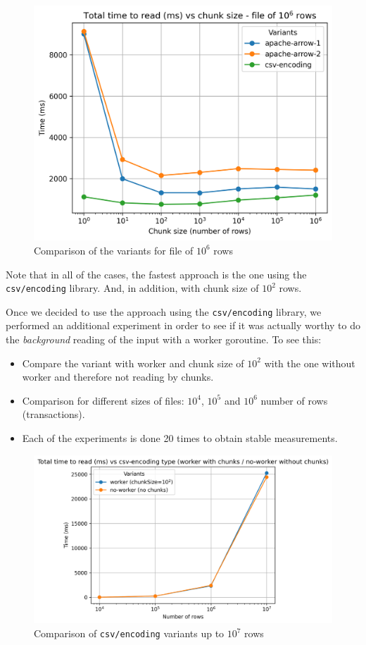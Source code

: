 \documentclass{article}
\begin{document}
\begin{figure}[H]
  \centering
  \includegraphics[scale = 0.7]{images/read-input-10-6.png}
  \caption{Comparison of the variants for file of $10^6$ rows}
\end{figure}

Note that in all of the cases, the fastest approach is the one using the \texttt{csv/encoding} library. And, in addition, with chunk size of $10^2$ rows.

Once we decided to use the approach using the \texttt{csv/encoding} library, we performed an additional experiment in order to see if it was actually worthy to do the \emph{background} reading of the input with a worker goroutine. To see this:

\begin{itemize}
  \item Compare the variant with worker and chunk size of $10^2$ with the one without worker and therefore not reading by chunks.
  \item Comparison for different sizes of files: $10^4$, $10^5$ and $10^6$ number of rows (transactions).
  \item Each of the experiments is done 20 times to obtain stable measurements.
\end{itemize}

\begin{figure}[H]
  \centering
  \includegraphics[scale = 0.7]{images/read-input-csv-encoding-all.png}
  \caption{Comparison of \texttt{csv/encoding} variants up to $10^7$ rows}
\end{figure}
\end{document}
